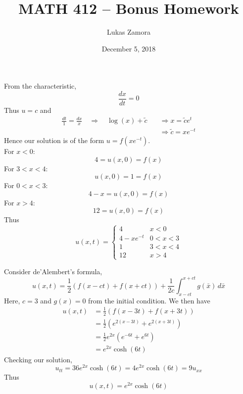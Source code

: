 \documentclass{article}
\title{MATH 412 -- Bonus Homework}
\author{Lukas Zamora}
\date{December 5, 2018}
\theoremstyle{definition}
\begin{document}
    \maketitle
    
    \begin{prob}{1} $  $ \vspace{3mm} \\
        From the characteristic,
        \[
            \frac{dx}{dt} = 0
        \]
        Thus $u=c$ and 
        \begin{align*}
            \frac{dt}{1} = \frac{dx}{x} \quad \Rightarrow \quad \log(x) + \tilde{c} \quad &\Rightarrow x = \tilde{c} e^t \\
            &\Rightarrow \tilde{c} = xe^{-t}
        \end{align*}
        Hence our solution is of the form $u=f(xe^{-t})$. \\

        For $x<0$:
        \[
            4 = u(x,0) = f(x)
        \]
        For $3<x<4$:
        \[
            u(x,0) = 1 = f(x)
        \]
        For $0<x<3$:
        \[
            4-x = u(x,0) = f(x)
        \]
        For $x>4$:
        \[
            12 = u(x,0) = f(x)
        \]
        Thus 
        \[
            u(x,t) = \begin{cases} 4 & x<0 \\ 4-xe^{-t} & 0<x<3 \\ 1 & 3<x<4 \\ 12 &x>4   \end{cases}
        \]
        
    \end{prob}
    

    \begin{prob}{3} $  $ \vspace{3mm} \\
        Consider de'Alembert's formula,
        \[
            u(x,t) = \frac{1}{2}(f(x-ct) + f(x+ct)) + \frac{1}{2c}\int_{x-ct}^{x+ct} g(\bar{x}) \, d\bar{x}
        \]
        Here, $c=3$ and $g(x)=0$ from the initial condition. We then have
        \begin{align*}
            u(x,t) &= \frac{1}{2}(f(x-3t) + f(x+3t)) \\
                   &= \frac{1}{2} \left( e^{2(x-3t)} + e^{2(x+3t)} \right) \\
                   &= \frac{1}{2} e^{2x}\left( e^{-6t} + e^{6t} \right) \\
                   &= e^{2x} \cosh(6t)
        \end{align*}
        Checking our solution,
        \[
            u_{tt} = 36e^{2x}\cosh(6t) = 4e^{2x}\cosh(6t) = 9u_{xx}
        \]
        Thus
        \[
            u(x,t) = e^{2x}\cosh(6t)
        \]
    \end{prob}
    
\end{document}

